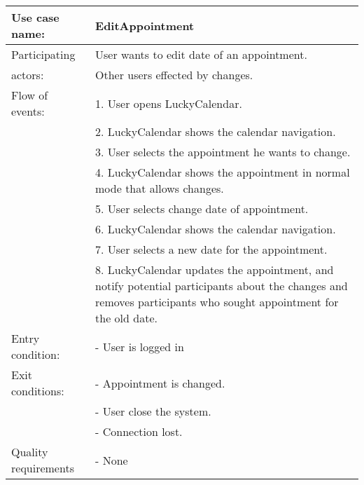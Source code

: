 {\tabulinesep=1.2mm
\begin{tabu}{ | p{3cm} | p{13cm} |}
    \hline
    Use case name: 			& 		EditAppointment\\ \hline
    Participating  			& 		User wants to edit date of an appointment. \\
    actors:					&		Other users effected by changes.\\ \hline
    Flow of events: 		& 		1. User opens LuckyCalendar. \\
							&		2. LuckyCalendar shows the calendar navigation.\\
							&		3. User selects the appointment he wants to change.\\
							&		4. LuckyCalendar shows the appointment in normal mode that allows changes.\\
							&		5. User selects change date of appointment.\\
							&		6. LuckyCalendar shows the calendar navigation.\\
							&		7. User selects a new date for the appointment.\\
							&		8. LuckyCalendar updates the appointment, and notify potential participants about the changes and removes participants who sought appointment for the old 			date.\\ \hline
    Entry condition: 		& 		- User is logged in  \\ \hline
	Exit conditions: 		&		- Appointment is changed.\\
							&		- User close the system.\\
							&		- Connection lost.\\\hline
	Quality requirements	&	 	- None \\\hline
\end{tabu}
}